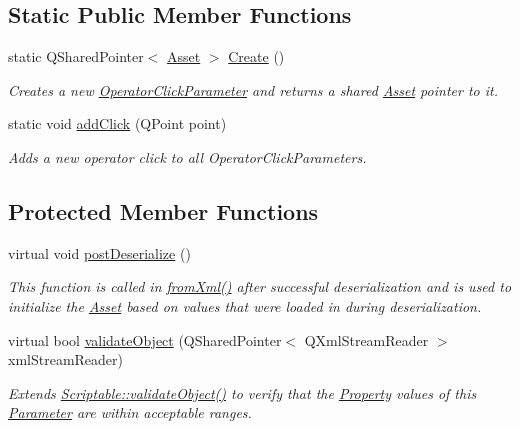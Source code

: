 \subsection*{Static Public Member Functions}
\begin{DoxyCompactItemize}
\item 
static Q\-Shared\-Pointer$<$ \hyperlink{class_picto_1_1_asset}{Asset} $>$ \hyperlink{class_picto_1_1_operator_click_parameter_a00ce798699e1d01038af4251a6d96937}{Create} ()
\begin{DoxyCompactList}\small\item\em Creates a new \hyperlink{class_picto_1_1_operator_click_parameter}{Operator\-Click\-Parameter} and returns a shared \hyperlink{class_picto_1_1_asset}{Asset} pointer to it. \end{DoxyCompactList}\item 
static void \hyperlink{class_picto_1_1_operator_click_parameter_abd7c45377fa12ded4bfc175d9705f143}{add\-Click} (Q\-Point point)
\begin{DoxyCompactList}\small\item\em Adds a new operator click to all Operator\-Click\-Parameters. \end{DoxyCompactList}\end{DoxyCompactItemize}
\subsection*{Protected Member Functions}
\begin{DoxyCompactItemize}
\item 
virtual void \hyperlink{class_picto_1_1_operator_click_parameter_a452be1b9e53895dfc8aa0c61d45a18b1}{post\-Deserialize} ()
\begin{DoxyCompactList}\small\item\em This function is called in \hyperlink{class_picto_1_1_asset_a8bed4da09ecb1c07ce0dab313a9aba67}{from\-Xml()} after successful deserialization and is used to initialize the \hyperlink{class_picto_1_1_asset}{Asset} based on values that were loaded in during deserialization. \end{DoxyCompactList}\item 
virtual bool \hyperlink{class_picto_1_1_operator_click_parameter_a0204b211e581f5d66079d6d543eeb038}{validate\-Object} (Q\-Shared\-Pointer$<$ Q\-Xml\-Stream\-Reader $>$ xml\-Stream\-Reader)
\begin{DoxyCompactList}\small\item\em Extends \hyperlink{class_picto_1_1_scriptable_ab6e2944c43a3b5d418bf7b251594386d}{Scriptable\-::validate\-Object()} to verify that the \hyperlink{class_picto_1_1_property}{Property} values of this \hyperlink{class_picto_1_1_parameter}{Parameter} are within acceptable ranges. \end{DoxyCompactList}\end{DoxyCompactItemize}
